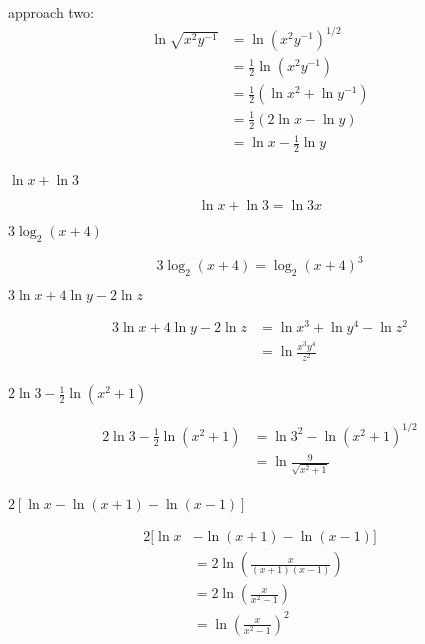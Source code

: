 \documentclass{exam}
\begin{document}
\begin{questions}
\begin{solution}
approach two:
\begin{align*}
  \ln \sqrt{x^2y^{-1}} &= \ln \left(x^2y^{-1} \right)^{1/2} \\
  &= \frac{1}{2} \ln \left( x^2 y^{-1} \right) \\
  &= \frac{1}{2} \left( \ln x^2 + \ln y^{-1} \right) \\
  &= \frac{1}{2} \left( 2 \ln x - \ln y \right) \\
  &= \ln x - \frac{1}{2} \ln y \\
\end{align*}

\end{solution}


\question $\ln x + \ln 3$
\label{condense:first}
\begin{solution}
\[
  \ln x + \ln 3 = \ln 3x
\]
\end{solution}

\question $3 \log_2(x + 4)$
\begin{solution}
\[
  3 \log_2(x + 4) = \log_2 (x + 4)^3
\]
\end{solution}

\question $3 \ln x + 4 \ln y - 2 \ln z$
\begin{solution}
\begin{align*}
  3 \ln x + 4 \ln y - 2 \ln z &= \ln x^3 + \ln y^4 - \ln z^2 \\
  &= \ln \frac{x^3y^4}{z^2} \\
\end{align*}
\end{solution}

\question $2 \ln 3 - \frac{1}{2} \ln \left(x^2 + 1 \right)$
\begin{solution}
\begin{align*}
  2 \ln 3 - \frac{1}{2} \ln \left(x^2 + 1 \right) &= \ln 3^2 - \ln \left( x^2 + 1 \right)^{1/2} \\
  &= \ln \frac{9}{\sqrt{x^2 + 1}} \\
\end{align*}

\end{solution}

\question $2[ \ln x - \ln(x + 1) - \ln(x - 1)]$
\label{condense:last}

\begin{solution}
\begin{align*}
  2[ \ln x &- \ln(x + 1) - \ln(x - 1)] \\
  &= 2 \ln \left( \frac{x}{(x+1)(x-1)} \right) \\
  &= 2 \ln \left( \frac{x}{x^2-1} \right) \\
  &= \ln \left( \frac{x}{x^2-1} \right)^2 \\
\end{align*}
\end{solution}


\end{questions}
\end{document}
